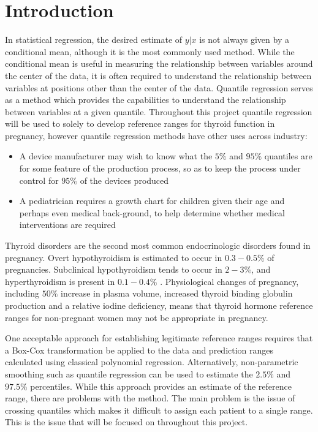 \documentclass[12pt,a4paper]{report}
\begin{document}
\chapter{Introduction}
In statistical regression, the desired estimate of $y|x$ is not always given by a conditional mean, although it is the most commonly used method. While the conditional mean is useful in measuring the relationship between variables around the center of the data, it is often required to understand the relationship between variables at positions other than the center of the data. Quantile regression serves as a method which provides the capabilities to understand the relationship between variables at a given quantile. Throughout this project quantile regression will be used to solely to develop reference ranges for thyroid function in pregnancy, however quantile regression methods have other uses across industry:
\begin{itemize}
    \item A device manufacturer may wish to know what the $5\%$ and $95\%$ quantiles are for some feature of the production process, so as to keep the process under control for $95\%$ of the devices produced
    \item A pediatrician requires a growth chart for children given their age and perhaps even medical back-ground, to help determine whether medical interventions are required
\end{itemize}
Thyroid disorders are the second most common endocrinologic disorders found in pregnancy. Overt hypothyroidism is estimated to occur in $0.3-0.5\%$ of pregnancies. Subclinical hypothyroidism tends to occur in $2-3\%$, and hyperthyroidism is present in $0.1-0.4\%$ \citep{Thyroid-Facts}. Physiological changes of pregnancy, including $50\%$ increase in plasma volume, increased thyroid binding globulin production and a relative iodine deficiency, means that thyroid hormone reference ranges for non-pregnant women may not be appropriate in pregnancy.
\vspace{2mm}

One acceptable approach for establishing legitimate reference ranges requires that a Box-Cox transformation be applied to the data and prediction ranges calculated using classical polynomial regression. Alternatively, non-parametric smoothing such as quantile regression can be used to estimate the $2.5\%$ and $97.5\%$ percentiles. While this approach provides an estimate of the reference range, there are problems with the method. The main problem is the issue of crossing quantiles which makes it difficult to assign each patient to a single range. This is the issue that will be focused on throughout this project.
\vspace{2mm}
\end{document}
